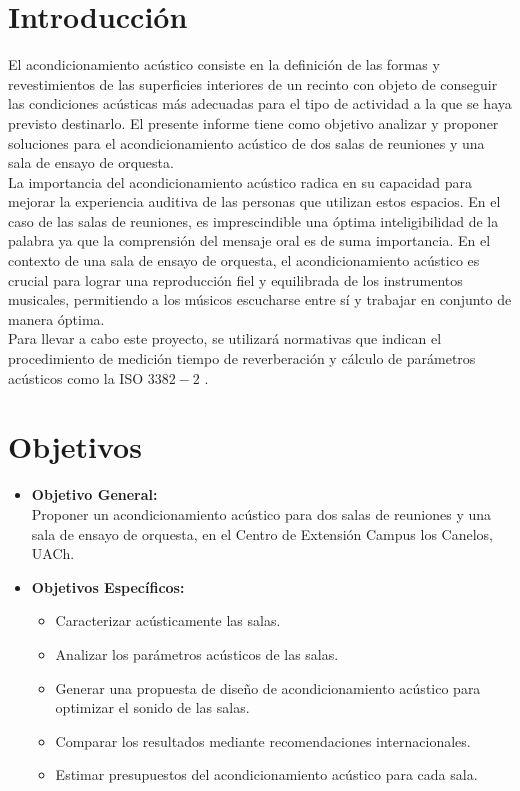 \section{Introducción}
\noindent El acondicionamiento acústico consiste en la definición de las formas y revestimientos de las superficies interiores de un recinto con objeto de conseguir las condiciones acústicas más adecuadas
para el tipo de actividad a la que se haya previsto destinarlo.\cite{carrion1990diseno}
El presente informe tiene como objetivo analizar y proponer soluciones para el acondicionamiento acústico de dos salas de reuniones y una sala de ensayo de orquesta. \\

\noindent
La importancia del acondicionamiento acústico radica en su capacidad para mejorar la experiencia auditiva de las personas que utilizan estos espacios.
En el caso de las salas de reuniones, es imprescindible una óptima inteligibilidad de la palabra ya que la comprensión del mensaje oral es de suma importancia. \cite{carrion1990diseno}
En el contexto de una sala de ensayo de orquesta, el acondicionamiento acústico es crucial para lograr una reproducción fiel y equilibrada de los instrumentos musicales, permitiendo a los músicos escucharse entre sí y trabajar en conjunto de manera óptima. \\
\noindent
Para llevar a cabo este proyecto, se utilizará normativas que indican el procedimiento de medición tiempo de reverberación y cálculo de parámetros acústicos como la ISO $3382-2$ \cite{ISO3382-2}.

\section{Objetivos}
\begin{itemize}
    \item \textbf{Objetivo General:} \\
    Proponer un acondicionamiento acústico para dos salas de reuniones y una sala de ensayo de orquesta, en el Centro de Extensión Campus los Canelos, UACh.

    \item \textbf{Objetivos Específicos:}
    \begin{itemize}
        \item Caracterizar acústicamente las salas.
        \item Analizar los parámetros acústicos de las salas.
        \item Generar una propuesta de diseño de acondicionamiento acústico para optimizar el sonido de las salas.
        \item Comparar los resultados mediante recomendaciones internacionales. 
        \item Estimar presupuestos del acondicionamiento acústico para cada sala.

    \end{itemize}
\end{itemize}